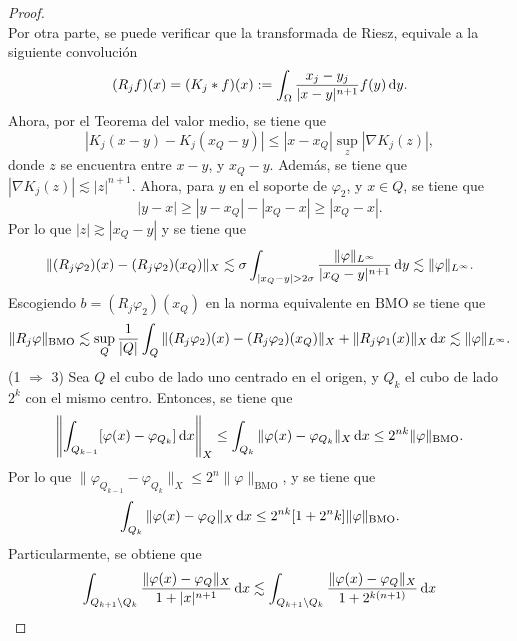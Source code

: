 \begin{proof}
\begin{equation}
	\end{equation}
	Por otra parte, se puede verificar que la transformada de Riesz, equivale a la siguiente convolución
	\begin{equation*}
		(R_jf)(x) = (K_j*f)(x) := \int_{\Omega} \frac{x_j-y_j}{|x-y|^{n+1}} f(y) \mathop{}\!\mathrm{d} y.
	\end{equation*}
	Ahora, por el Teorema del valor medio, se tiene que 
	\begin{equation*}
		|K_j(x-y)-K_j(x_Q-y)| \leq |x-x_Q| \sup_z |\nabla K_j(z)|,
	\end{equation*}
	donde $z$ se encuentra entre $x-y$, y $x_Q - y$. Además, se tiene que $|\nabla K_j(z)| \lesssim |z|^{n+1}$. Ahora, para $y$ en el soporte de $\varphi_2$, y $x\in Q$, se tiene que 
	\begin{equation*}
		|y-x| \geq |y-x_Q| - |x_Q-x| \geq |x_Q - x|.
	\end{equation*}
	Por lo que $|z| \gtrsim |x_Q - y|$ y se tiene que 
	\begin{equation}\label{eq:Rj-diff-L-infty}
		\|(R_j\varphi_2)(x) - (R_j\varphi_2)(x_Q)\|_X \lesssim \sigma \int_{|x_Q-y|>2\sigma} \frac{\|\varphi\|_{L^\infty}}{|x_Q - y|^{n+1}}\diff y \lesssim \|\varphi\|_{L^\infty}. 
	\end{equation}
	Escogiendo $b=(R_j\varphi_2)(x_Q)$ en la norma equivalente en $\mathrm{BMO}$ se tiene que 
	\begin{equation*}
		\|R_j\varphi\|_{\mathrm{BMO}} \lesssim \sup_Q \frac{1}{|Q|} \int_Q \|(R_j\varphi_2)(x) - (R_j\varphi_2)(x_Q)\|_X + \|R_j\varphi_1(x)\|_X \mathop{}\!\mathrm{d} x \lesssim \|\varphi\|_{L^\infty}.
	\end{equation*}
	(1 $\Rightarrow$ 3) Sea $Q$ el cubo de lado uno centrado en el origen, y $Q_k$ el cubo de lado $2^k$ con el mismo centro. Entonces, se tiene que
	\begin{equation*}
		\left\| \int_{Q_{k-1}}[\varphi(x) - \varphi_{Q_k}] \mathop{}\!\mathrm{d} x
		\right\|_X \leq \int_{Q_k} \|\varphi(x) - \varphi_{Q_k}\|_X \mathop{}\!\mathrm{d} x \leq 2^{nk}\|\varphi\|_{\mathrm{BMO}}.
	\end{equation*}
	Por lo que $\|\varphi_{Q_{k-1}} - \varphi_{Q_k}\|_X \leq 2^n\|\varphi\|_{\mathrm{BMO}}$, y se tiene que
	\begin{equation*}
		\int_{Q_k} \|\varphi(x)-\varphi_Q\|_X \mathop{}\!\mathrm{d} x \leq 2^{nk}[1+2^nk] \|\varphi\|_{\mathrm{BMO}}.
	\end{equation*}
	Particularmente, se obtiene que
	\begin{align*}
		\int_{Q_{k+1}\setminus Q_k} \frac{\|\varphi(x)-\varphi_Q\|_X}{1+|x|^{n+1}} \diff x & \lesssim \int_{Q_{k+1}\setminus Q_k} \frac{\|\varphi(x)-\varphi_Q\|_X}{1+2^{k(n+1)}} \diff x \\

\end{align*}
\end{proof}
